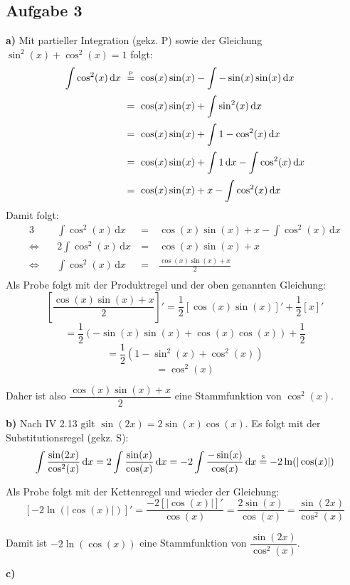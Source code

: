 \documentclass[a4paper,graphics,11pt]{article}
\newcommand{\aufgabe}[1]{\subsection*{Aufgabe #1}}
\newcommand{\up}[2]{\mathrel{\overset{\makebox[0pt]{\mbox{\normalfont\tiny #2}}}{#1}}}
\begin{document}
\newpage

\aufgabe{3}

\textbf{a)}
Mit partieller Integration (gekz. P) sowie der Gleichung $\sin^2(x)+\cos^2(x) = 1$ folgt:
\begin{alignat*}{2}
    \int \cos^2(x)\, \mathrm{d}x &\ \up{=}{P}\ \cos(x)\sin(x) - \int -\sin(x)\sin(x)\, \mathrm{d}x \\[2pt]
    &\ =\ \cos(x)\sin(x)+\int \sin^2(x)\, \mathrm{d}x \\[2pt]
    &\ =\ \cos(x)\sin(x)+\int 1-\cos^2(x)\, \mathrm{d}x \\[2pt]
    &\ =\ \cos(x)\sin(x)+\int 1\, \mathrm{d}x - \int \cos^2(x)\, \mathrm{d}x \\[2pt]
    &\ =\ \cos(x)\sin(x)+x - \int \cos^2(x)\, \mathrm{d}x
\end{alignat*}
Damit folgt:
\begin{alignat*}{3}
    &\int \cos^2(x)\, \mathrm{d}x &\ =\ &\cos(x)\sin(x)+x - \int \cos^2(x)\, \mathrm{d}x \\[2pt]
    \Longleftrightarrow\quad & 2\int \cos^2(x)\, \mathrm{d}x &\ =\ & \cos(x)\sin(x)+x\\[2pt]
    \Longleftrightarrow\quad & \int \cos^2(x)\, \mathrm{d}x &\ =\ & \frac{\cos(x)\sin(x)+x}{2}\\[2pt]
\end{alignat*}
Als Probe folgt mit der Produktregel und der oben genannten Gleichung:
$$
    \left[\frac{\cos(x)\sin(x)+x}{2}\right]'
    = \frac{1}{2}[\cos(x)\sin(x)]'+\frac{1}{2}[x]'
$$$$
    = \frac{1}{2}(-\sin(x)\sin(x)+\cos(x)\cos(x))+\frac{1}{2}
$$$$
    = \frac{1}{2}(1-\sin^2(x)+\cos^2(x))
$$$$
    = \cos^2(x)
$$

Daher ist also $\dfrac{\cos(x)\sin(x)+x}{2}$ eine Stammfunktion von $\cos^2(x)$.

\textbf{b)}
Nach IV 2.13 gilt $\sin(2x) = 2\sin(x)\cos(x)$. Es folgt mit der Substitutionsregel (gekz. S):
$$
    \int \frac{\sin(2x)}{\cos^2(x)}\, \mathrm{d}x
    = 2\int \frac{\sin(x)}{\cos(x)}\, \mathrm{d}x
    = -2\int \frac{-\sin(x)}{\cos(x)}\, \mathrm{d}x
    \up{=}{S} -2\ln(|\cos(x)|)
$$

Als Probe folgt mit der Kettenregel und wieder der Gleichung:
$$
    [-2\ln(|\cos(x)|)]'
    = \frac{-2[|\cos(x)|]'}{\cos(x)}
    = \frac{2\sin(x)}{\cos(x)}
    = \frac{\sin(2x)}{\cos^2(x)}
$$

Damit ist $-2\ln(\cos(x))$ eine Stammfunktion von $\dfrac{\sin(2x)}{\cos^2(x)}$.
\newpage

\textbf{c)}
\end{document}
